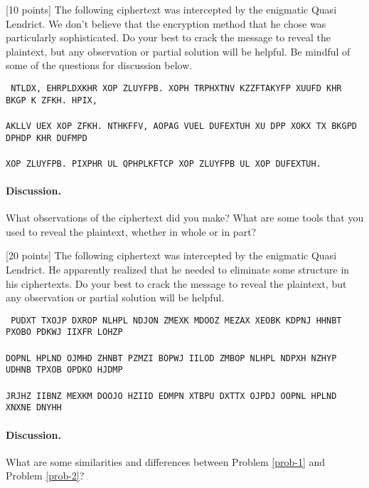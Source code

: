 \begin{problem}
\label{prob-1} [10 points]
The following ciphertext was intercepted by the enigmatic Quasi Lendrict. We don't believe that the encryption method that he chose was particularly sophisticated. Do your best to crack the message to reveal the plaintext, but any observation or partial solution will be helpful. Be mindful of some of the questions for discussion below.  \\
\end{problem}
{\tt
\noindent NTLDX, EHRPLDXKHR XOP ZLUYFPB. XOPH TRPHXTNV KZZFTAKYFP XUUFD KHR BKGP K ZFKH. HPIX, \\
\\
AKLLV UEX XOP ZFKH. NTHKFFV, AOPAG VUEL DUFEXTUH XU DPP XOKX TX BKGPD DPHDP KHR DUFMPD\\
\\
 XOP ZLUYFPB. PIXPHR UL QPHPLKFTCP XOP ZLUYFPB UL XOP DUFEXTUH.}

\paragraph*{Discussion.} What observations of the ciphertext did you make? What are some tools that you used to reveal the plaintext, whether in whole or in part? %


\begin{problem}
\label{prob-2} [20 points]
The following ciphertext was intercepted by the enigmatic Quasi Lendrict. He apparently realized that he needed to eliminate some structure in his ciphertexts. Do your best to crack the message to reveal the plaintext, but any observation or partial solution will be helpful.\\
\end{problem}
{\tt
\noindent PUDXT TXOJP DXROP NLHPL NDJON ZMEXK MDOOZ MEZAX XEOBK KDPNJ HHNBT PXOBO PDKWJ IIXFR LOHZP \\
\\
DOPNL HPLND OJMHD ZHNBT PZMZI BOPWJ IILOD ZMBOP NLHPL NDPXH NZHYP UDHNB TPXOB OPDKO HJDMP \\
\\
JRJHZ IIBNZ MEXKM DOOJO HZIID EDMPN XTBPU DXTTX OJPDJ OOPNL HPLND XNXNE DNYHH}

\paragraph*{Discussion.} What are some similarities and differences between Problem \ref{prob-1} and Problem \ref{prob-2}?

